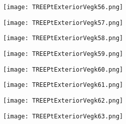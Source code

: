 \documentclass[pdf]{beamer}
\begin{document}
\begin{frame}
\begin{figure}[!h]
\centering
\texttt{[image: TREEPtExteriorVegk56.png]}
\end{figure}
\end{frame}

\begin{frame}
\begin{figure}[!h]
\centering
\texttt{[image: TREEPtExteriorVegk57.png]}
\end{figure}
\end{frame}

\begin{frame}
\begin{figure}[!h]
\centering
\texttt{[image: TREEPtExteriorVegk58.png]}
\end{figure}
\end{frame}

\begin{frame}
\begin{figure}[!h]
\centering
\texttt{[image: TREEPtExteriorVegk59.png]}
\end{figure}
\end{frame}

\begin{frame}
\begin{figure}[!h]
\centering
\texttt{[image: TREEPtExteriorVegk60.png]}
\end{figure}
\end{frame}

\begin{frame}
\begin{figure}[!h]
\centering
\texttt{[image: TREEPtExteriorVegk61.png]}
\end{figure}
\end{frame}

\begin{frame}
\begin{figure}[!h]
\centering
\texttt{[image: TREEPtExteriorVegk62.png]}
\end{figure}
\end{frame}

\begin{frame}
\begin{figure}[!h]
\centering
\texttt{[image: TREEPtExteriorVegk63.png]}
\end{figure}
\end{frame}
\end{document}
